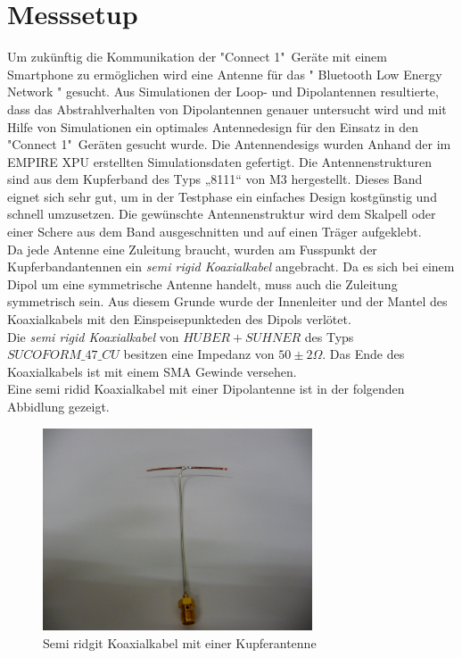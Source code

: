 \section{Messsetup}
Um zukünftig die Kommunikation der "Connect 1"\   Geräte mit einem Smartphone zu ermöglichen wird eine Antenne für das " Bluetooth Low Energy Network " gesucht. Aus Simulationen der Loop- und Dipolantennen resultierte, dass das Abstrahlverhalten von Dipolantennen genauer untersucht wird und mit Hilfe von Simulationen ein optimales Antennedesign für den Einsatz in den "Connect 1"\  Geräten gesucht wurde. 
Die Antennendesigs wurden Anhand der im EMPIRE XPU erstellten Simulationsdaten gefertigt. Die Antennenstrukturen sind aus dem Kupferband des Typs „8111“ von M3 hergestellt. Dieses Band eignet sich sehr gut, um in der Testphase ein einfaches Design kostgünstig und schnell umzusetzen. Die gewünschte Antennenstruktur wird dem Skalpell oder einer Schere aus dem Band ausgeschnitten und auf einen Träger aufgeklebt. \\
Da jede Antenne eine Zuleitung braucht, wurden am Fusspunkt der Kupferbandantennen ein \textit{semi rigid Koaxialkabel} angebracht. Da es sich bei einem Dipol um eine symmetrische Antenne handelt, muss auch die Zuleitung symmetrisch sein. Aus diesem Grunde wurde der Innenleiter und der Mantel des Koaxialkabels mit den Einspeisepunkteden des Dipols verlötet.\\
Die \textit{semi rigid Koaxialkabel} von $HUBER+SUHNER$ des Typs $SUCOFORM\_47\_CU$ besitzen eine Impedanz von $50  \pm 2\Omega$. Das Ende des Koaxialkabels ist mit einem SMA Gewinde versehen.\\

Eine semi ridid Koaxialkabel mit einer Dipolantenne ist in der folgenden Abbidlung gezeigt.
\begin{figure}[!h]
	\centering
	\includegraphics[width=8cm]{content/bilder/Implementierung/KoaxMitAntenne.JPG}%
	\caption{Semi ridgit Koaxialkabel mit einer Kupferantenne}
	\label{fig:KoaxMitAntenne}
\end{figure}


